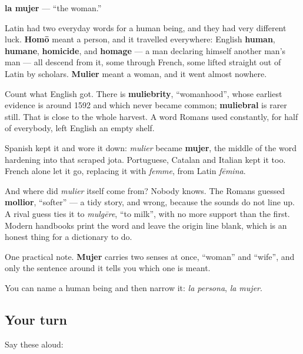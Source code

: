 \begin{cousinweb}
\textbf{la mujer} — \textquotedblleft{}the woman.\textquotedblright{}

Latin had two everyday words for a human being, and they had very different luck. \textbf{Homō} meant a person, and it travelled everywhere: English \textbf{human}, \textbf{humane}, \textbf{homicide}, and \textbf{homage} — a man declaring himself another man's man — all descend from it, some through French, some lifted straight out of Latin by scholars. \textbf{Mulier} meant a woman, and it went almost nowhere.

Count what English got. There is \textbf{muliebrity}, \textquotedblleft{}womanhood\textquotedblright{}, whose earliest evidence is around 1592 and which never became common; \textbf{muliebral} is rarer still. That is close to the whole harvest. A word Romans used constantly, for half of everybody, left English an empty shelf.

Spanish kept it and wore it down: \emph{mulier} became \textbf{mujer}, the middle of the word hardening into that scraped jota. Portuguese, Catalan and Italian kept it too. French alone let it go, replacing it with \emph{femme}, from Latin \emph{fēmina}.

And where did \emph{mulier} itself come from? Nobody knows. The Romans guessed \textbf{mollior}, \textquotedblleft{}softer\textquotedblright{} — a tidy story, and wrong, because the sounds do not line up. A rival guess ties it to \emph{mulgēre}, \textquotedblleft{}to milk\textquotedblright{}, with no more support than the first. Modern handbooks print the word and leave the origin line blank, which is an honest thing for a dictionary to do.

One practical note. \textbf{Mujer} carries two senses at once, \textquotedblleft{}woman\textquotedblright{} and \textquotedblleft{}wife\textquotedblright{}, and only the sentence around it tells you which one is meant.
\end{cousinweb}

\begin{grammarlens}[title={What you've built}]
You can name a human being and then narrow it: \emph{la persona}, \emph{la mujer}.
\end{grammarlens}

\subsection*{Your turn}
Say these aloud:

